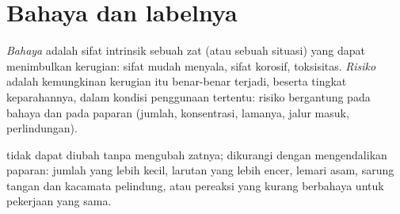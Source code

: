 \section{Bahaya dan labelnya}

\begin{definition}\label{def:b1:lab-techniques-1:hazard}
\emph{Bahaya} adalah sifat intrinsik sebuah zat (atau
sebuah situasi) yang dapat menimbulkan kerugian: sifat mudah menyala,
sifat korosif, toksisitas. \emph{Risiko} adalah
kemungkinan kerugian itu benar-benar terjadi, beserta tingkat
keparahannya, dalam kondisi penggunaan tertentu: risiko bergantung pada
bahaya dan pada paparan (jumlah, konsentrasi, lamanya, jalur masuk,
perlindungan).
\end{definition}

 tidak dapat diubah tanpa mengubah zatnya;  dikurangi dengan
mengendalikan paparan: jumlah yang lebih kecil, larutan yang lebih encer,
lemari asam, sarung tangan dan kacamata pelindung, atau pereaksi yang
kurang berbahaya untuk pekerjaan yang sama.

